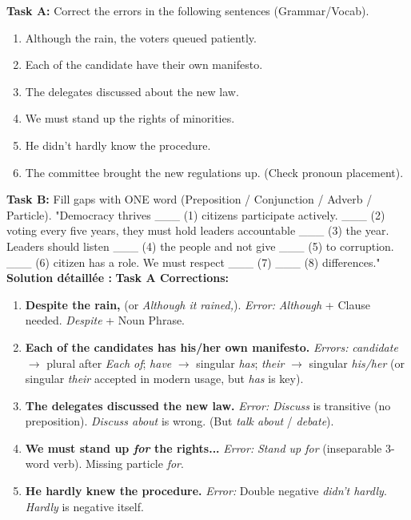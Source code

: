\documentclass[11pt]{article}
\begin{document}
\begin{exoresolu}
    \textbf{Task A:} Correct the errors in the following sentences (Grammar/Vocab).
    \begin{enumerate}
        \item Although the rain, the voters queued patiently.
        \item Each of the candidate have their own manifesto.
        \item The delegates discussed about the new law.
        \item We must stand up the rights of minorities.
        \item He didn't hardly know the procedure.
        \item The committee brought the new regulations up. (Check pronoun placement).
    \end{enumerate}
    \textbf{Task B:} Fill gaps with ONE word (Preposition / Conjunction / Adverb / Particle).
    "Democracy thrives \_\_\_ (1) citizens participate actively. \_\_\_ (2) voting every five years, they must hold leaders accountable \_\_\_ (3) the year. Leaders should listen \_\_\_ (4) the people and not give \_\_\_ (5) to corruption. \_\_\_ (6) citizen has a role. We must respect \_\_\_ (7) \_\_\_ (8) differences."
    \tcblower
    \textbf{Solution détaillée :}
    \textbf{Task A Corrections:}
    \begin{enumerate}
        \item \textbf{Despite the rain,} (or \emph{Although it rained,}). \textit{Error:} \emph{Although} + Clause needed. \emph{Despite} + Noun Phrase.
        \item \textbf{Each of the candidates has his/her own manifesto.} \textit{Errors:} \emph{candidate} $\to$ plural after \emph{Each of}; \emph{have} $\to$ singular \emph{has}; \emph{their} $\to$ singular \emph{his/her} (or singular \emph{their} accepted in modern usage, but \emph{has} is key).
        \item \textbf{The delegates discussed the new law.} \textit{Error:} \emph{Discuss} is transitive (no preposition). \emph{Discuss about} is wrong. (But \emph{talk about} / \emph{debate}).
        \item \textbf{We must stand up \emph{for} the rights...} \textit{Error:} \emph{Stand up for} (inseparable 3-word verb). Missing particle \emph{for}.
        \item \textbf{He hardly knew the procedure.} \textit{Error:} Double negative \emph{didn't hardly}. \emph{Hardly} is negative itself.

\end{enumerate}
\end{exoresolu}
\end{document}
